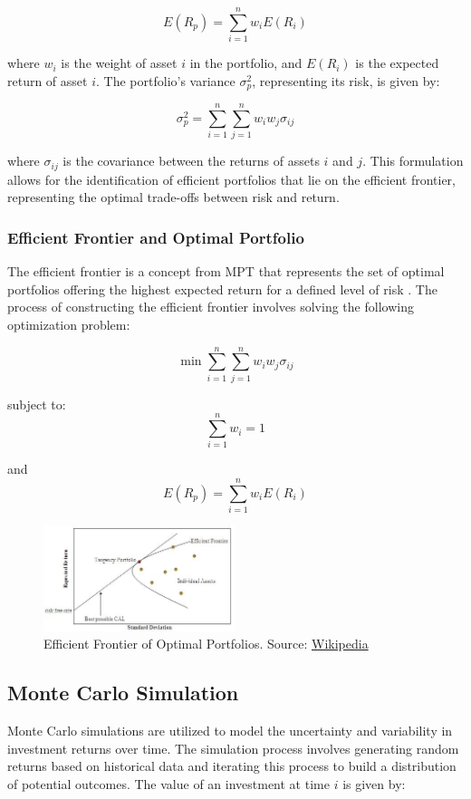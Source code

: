 \[
E(R_p) = \sum_{i=1}^{n} w_i E(R_i)
\]

where \( w_i \) is the weight of asset \( i \) in the portfolio, and \( E(R_i) \) is the expected return of asset \( i \). The portfolio’s variance \( \sigma^2_p \), representing its risk, is given by:

\[
\sigma^2_p = \sum_{i=1}^{n} \sum_{j=1}^{n} w_i w_j \sigma_{ij}
\]

where \( \sigma_{ij} \) is the covariance between the returns of assets \( i \) and \( j \). This formulation allows for the identification of efficient portfolios that lie on the efficient frontier, representing the optimal trade-offs between risk and return.

\subsubsection{Efficient Frontier and Optimal Portfolio}
The efficient frontier is a concept from MPT that represents the set of optimal portfolios offering the highest expected return for a defined level of risk \citep{markowitz1952portfolio}. The process of constructing the efficient frontier involves solving the following optimization problem:

\[
\min \sum_{i=1}^{n} \sum_{j=1}^{n} w_i w_j \sigma_{ij}
\]

subject to:
\[
\sum_{i=1}^{n} w_i = 1
\]

and
\[
E(R_p) = \sum_{i=1}^{n} w_i E(R_i)
\]

\begin{figure}[h]
\centering
\includegraphics[width=0.5\textwidth]{efficient_frontier.png} 
\caption{Efficient Frontier of Optimal Portfolios. Source: \href{https://en.wikipedia.org/wiki/Efficient_frontier}{Wikipedia}}
\label{fig:efficient_frontier}
\end{figure}

\subsection{Monte Carlo Simulation}
Monte Carlo simulations are utilized to model the uncertainty and variability in investment returns over time. The simulation process involves generating random returns based on historical data and iterating this process to build a distribution of potential outcomes. The value of an investment at time \( i \) is given by:

